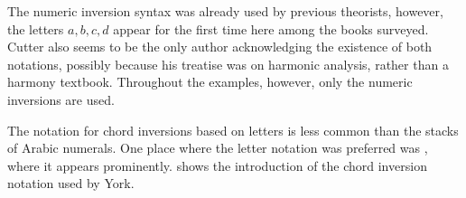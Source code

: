 The numeric inversion syntax was already used by previous
theorists, however, the letters ${a, b, c , d}$ appear for
the first time here among the books surveyed. Cutter also
seems to be the only author acknowledging the existence of
both notations, possibly because his treatise was on
harmonic analysis, rather than a harmony textbook.
Throughout the examples, however, only the numeric
inversions are used.



The notation for chord inversions based on letters is less
common than the stacks of Arabic numerals. One place where
the letter notation was preferred was
\textcite{york1909practical}, where it appears prominently.
 shows the
introduction of the chord inversion notation used by York.
